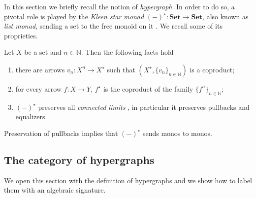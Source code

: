 \documentclass[a4paper,UKenglish,cleveref,pdftex,thm-restate,numberwithinsect]{lipics-v2021}
\newcommand{\lgh}{\mathsf{lg}}
\newcommand{\Set}{\mathbf{Set}}
\def\X{\textbf {\textup{X}}}
\begin{document}
In this section we briefly recall the notion of \emph{hypergraph}. In order to do so, a pivotal role is played by the \emph{Kleen star monad} $(-)^\star\colon \Set\to \Set$, also known as 
\emph{list monad},
sending a set to the free monoid on it \cite{sakarovitch2009elements,Wadler95}.
We recall some of its proprieties.

\begin{proposition}\label{prop:fact}
	Let $X$ be a set and $n\in \mathbb{N}$. Then the following facts hold
	\begin{enumerate}
		\item there are arrows $v_{n}\colon X^n\to X^\star $ such that $(X^\star, \{v_{n}\}_{n\in \mathbb{N}})$ is a coproduct;
		\item for every arrow $f\colon X\to Y$, $f^\star$ is the coproduct of the family $\{f^n\}_{n\in \mathbb{N}}$;
		\item $(-)^\star$ preserves all \emph{connected limits} \cite{carboni1995connected}, in particular it preserves pullbacks and equalizers.
	\end{enumerate}
\end{proposition}

\begin{remark}\label{rem:mono}
	Preservation of pullbacks implies that $(-)^\star$ sends monos to monos.
\end{remark}


\subsection{The category of hypergraphs}

We open this section with the definition of hypergraphs and we show how to label them with an algebraic signature.  
\end{document}
